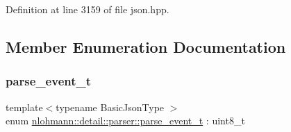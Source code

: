 Definition at line 3159 of file json.\+hpp.



\subsection{Member Enumeration Documentation}
\mbox{\label{classnlohmann_1_1detail_1_1parser_a37ac88c864dda495f72cb62776b0bebe}} 
\subsubsection{\texorpdfstring{parse\+\_\+event\+\_\+t}{parse\_event\_t}}
{\footnotesize\ttfamily template$<$typename Basic\+Json\+Type $>$ \\
enum \hyperlink{classnlohmann_1_1detail_1_1parser_a37ac88c864dda495f72cb62776b0bebe}{nlohmann\+::detail\+::parser\+::parse\+\_\+event\+\_\+t} \+: uint8\+\_\+t\hspace{0.3cm}{\ttfamily [strong]}}

